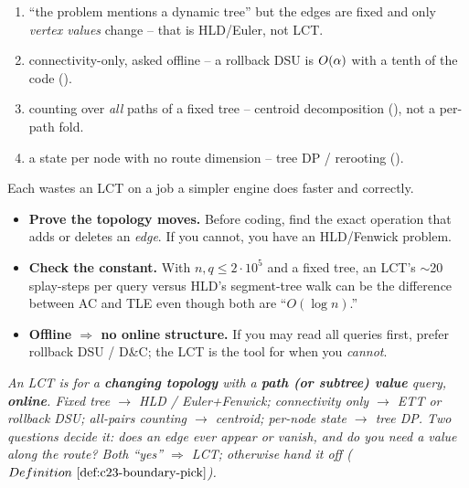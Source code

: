 \begin{warningbox}
\begin{enumerate}[nosep,leftmargin=1.6em]
  \item ``the problem mentions a dynamic tree'' but the edges are fixed and only
        \emph{vertex values} change -- that is HLD/Euler, not LCT.
  \item connectivity-only, asked offline -- a rollback DSU is \(O(\alpha)\) with a
        tenth of the code ().
  \item counting over \emph{all} paths of a fixed tree -- centroid decomposition
        (), not a per-path fold.
  \item a state per node with no route dimension -- tree DP / rerooting ().
\end{enumerate}
Each wastes an LCT on a job a simpler engine does faster and correctly.
\end{warningbox}

\begin{hardeningbox}
\begin{itemize}[nosep,leftmargin=1.4em]
  \item \textbf{Prove the topology moves.} Before coding, find the exact operation that
        adds or deletes an \emph{edge}. If you cannot, you have an HLD/Fenwick problem.
  \item \textbf{Check the constant.} With \(n,q\le 2\cdot10^5\) and a fixed tree, an
        LCT's \(\sim\)20 splay-steps per query versus HLD's segment-tree walk can be the
        difference between AC and TLE even though both are ``\(O(\log n)\).''
  \item \textbf{Offline \(\Rightarrow\) no online structure.} If you may read all queries
        first, prefer rollback DSU / D\&C; the LCT is the tool for when you \emph{cannot}.
\end{itemize}
\end{hardeningbox}

\begin{recallbox}
\emph{An LCT is for a \textbf{changing topology} with a \textbf{path (or subtree) value}
query, \textbf{online}. Fixed tree \(\to\) HLD / Euler+Fenwick; connectivity only \(\to\)
ETT or rollback DSU; all-pairs counting \(\to\) centroid; per-node state \(\to\) tree DP.
Two questions decide it: does an edge ever appear or vanish, and do you need a value
along the route? Both ``yes'' \(\Rightarrow\) LCT; otherwise hand it off
(\(\defref{c23-boundary-pick}\)).}
\end{recallbox}

